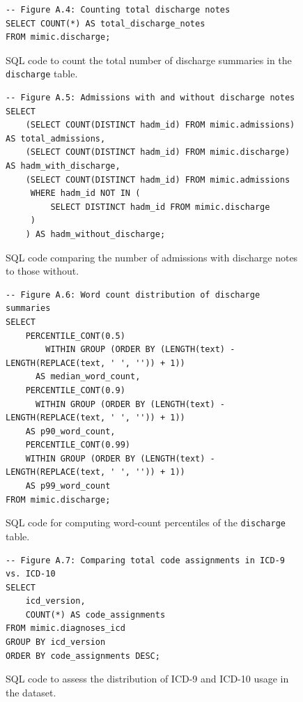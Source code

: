 \begin{figure}[H]
\centering
\begin{minipage}{\textwidth}
\begin{verbatim}
-- Figure A.4: Counting total discharge notes
SELECT COUNT(*) AS total_discharge_notes
FROM mimic.discharge;
\end{verbatim}
\end{minipage}
\caption{SQL code to count the total number of discharge summaries in the \texttt{discharge} table.}
\label{fig:sql4_discharge_notes}
\end{figure}

\begin{figure}[H]
\centering
\begin{minipage}{\textwidth}
\begin{verbatim}
-- Figure A.5: Admissions with and without discharge notes
SELECT
    (SELECT COUNT(DISTINCT hadm_id) FROM mimic.admissions) AS total_admissions,
    (SELECT COUNT(DISTINCT hadm_id) FROM mimic.discharge)  AS hadm_with_discharge,
    (SELECT COUNT(DISTINCT hadm_id) FROM mimic.admissions
     WHERE hadm_id NOT IN (
         SELECT DISTINCT hadm_id FROM mimic.discharge
     )
    ) AS hadm_without_discharge;
\end{verbatim}
\end{minipage}
\caption{SQL code comparing the number of admissions with discharge notes to those without.}
\label{fig:sql5_hadm_no_discharge}
\end{figure}

\begin{figure}[H]
\centering
\begin{minipage}{\textwidth}
\begin{verbatim}
-- Figure A.6: Word count distribution of discharge summaries
SELECT
    PERCENTILE_CONT(0.5)
        WITHIN GROUP (ORDER BY (LENGTH(text) - LENGTH(REPLACE(text, ' ', '')) + 1))
      AS median_word_count,
    PERCENTILE_CONT(0.9)
      WITHIN GROUP (ORDER BY (LENGTH(text) - LENGTH(REPLACE(text, ' ', '')) + 1))
    AS p90_word_count,
    PERCENTILE_CONT(0.99)
    WITHIN GROUP (ORDER BY (LENGTH(text) - LENGTH(REPLACE(text, ' ', '')) + 1))
    AS p99_word_count
FROM mimic.discharge;
\end{verbatim}
\end{minipage}
\caption{SQL code for computing word-count percentiles of the \texttt{discharge} table.}
\label{fig:sql6_note_wordcount}
\end{figure}

\begin{figure}[H]
\centering
\begin{minipage}{\textwidth}
\begin{verbatim}
-- Figure A.7: Comparing total code assignments in ICD-9 vs. ICD-10
SELECT
    icd_version,
    COUNT(*) AS code_assignments
FROM mimic.diagnoses_icd
GROUP BY icd_version
ORDER BY code_assignments DESC;
\end{verbatim}
\end{minipage}
\caption{SQL code to assess the distribution of ICD-9 and ICD-10 usage in the dataset.}
\label{fig:sql7_icd_version_counts}
\end{figure}

